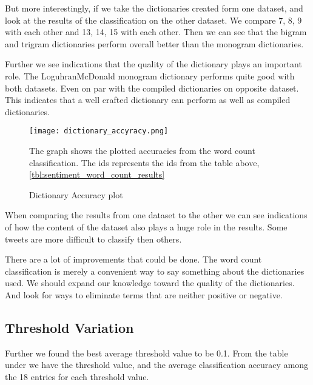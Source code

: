 But more interestingly, if we take the dictionaries created form one dataset,
and look at the results of the classification on the other dataset. We compare
7, 8, 9 with each other and 13, 14, 15 with each other. Then we can see that
the bigram and trigram dictionaries perform overall better than the monogram
dictionaries.

Further we see indications that the quality of the dictionary plays an
important role. The LoguhranMcDonald monogram dictionary performs quite good
with both datasets. Even on par with the compiled dictionaries on opposite
dataset. This indicates that a well crafted dictionary can perform as well
as compiled dictionaries.

\begin{figure}[htb]
    \centering
    \texttt{[image: dictionary\_accyracy.png]}
    \label{fig:dictionary_accyracy}
    \caption{Dictionary Accuracy plot}
The graph shows the plotted accuracies from the word count
classification. The ids represents the ids from the table above,
\ref{tbl:sentiment_word_count_results}
\end{figure}

When comparing the results from one dataset to the other we can see indications
of how the content of the dataset also plays a huge role in the results. Some
tweets are more difficult to classify then others.

There are a lot of improvements that could be done.
The word count classification is merely a convenient way to say something about
the dictionaries used. We should expand our knowledge toward the quality of the
dictionaries. And look for ways to eliminate terms that are neither positive or
negative. 

\subsection{Threshold Variation}\label{results:threshold}
Further we found the best average threshold value to be 0.1.
From the table under we have the threshold value, and the average
classification accuracy among the 18 entries for each threshold value.

